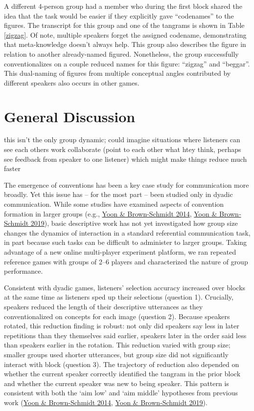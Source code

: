 \documentclass[
  english,
  a4paper,
]{article}
\begin{document}
A different 4-person group had a member who during the first block shared the idea that the task would be easier if they explicitly gave ``codenames'' to the figures. The transcript for this group and one of the tangrams is shown in Table \ref{zigzag}. Of note, multiple speakers forget the assigned codename, demonstrating that meta-knowledge doesn't always help. This group also describes the figure in relation to another already-named figured. Nonetheless, the group successfully conventionalizes on a couple reduced names for this figure: ``zigzag'' and ``beggar''. This dual-naming of figures from multiple conceptual angles contributed by different speakers also occurs in other games.

\hypertarget{general-discussion}{%
\section{General Discussion}\label{general-discussion}}

this isn't the only group dynamic; could imagine situations where listeners can see each others work collaborate (point to each other what htey think, perhaps see feedback from speaker to one listener) which might make things reduce much faster

The emergence of conventions has been a key case study for communication more broadly. Yet this issue has -- for the most part -- been studied only in dyadic communication. While some studies have examined aspects of convention formation in larger groups (e.g., \protect\hyperlink{ref-yoonAdjustingConceptualPacts2014}{Yoon \& Brown-Schmidt 2014}, \protect\hyperlink{ref-yoonAudienceDesignMultiparty2019}{Yoon \& Brown‐Schmidt 2019}), basic descriptive work has not yet investigated how group size changes the dynamics of interaction in a standard referential communication task, in part because such tasks can be difficult to administer to larger groups. Taking advantage of a new online multi-player experiment platform, we ran repeated reference games with groups of 2--6 players and characterized the nature of group performance.

Consistent with dyadic games, listeners' selection accuracy increased over blocks at the same time as listeners sped up their selections (question 1).
Crucially, speakers reduced the length of their descriptive utterances as they conventionalized on concepts for each image (question 2). Because speakers rotated, this reduction finding is robust: not only did speakers say less in later repetitions than they themselves said earlier, speakers later in the order said less than speakers earlier in the rotation. This reduction varied with group size; smaller groups used shorter utterances, but group size did not significantly interact with block (question 3). The trajectory of reduction also depended on whether the current speaker correctly identified the tangram in the prior block and whether the current speaker was new to being speaker. This pattern is consistent with both the `aim low' and `aim middle' hypotheses from previous work (\protect\hyperlink{ref-yoonAdjustingConceptualPacts2014}{Yoon \& Brown-Schmidt 2014}, \protect\hyperlink{ref-yoonAudienceDesignMultiparty2019}{Yoon \& Brown‐Schmidt 2019}).
\end{document}
